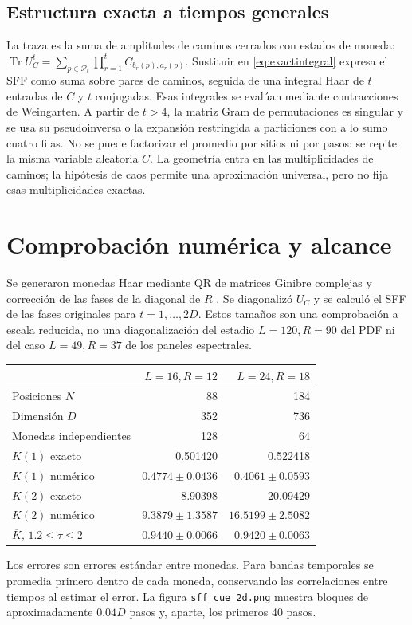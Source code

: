 \documentclass[11pt]{article}
\newcommand{\Tr}{\operatorname{Tr}}
\begin{document}
\subsection{Estructura exacta a tiempos generales}
La traza es la suma de amplitudes de caminos cerrados con estados de
moneda: $\Tr U_C^t=\sum_{p\in\mathcal P_t}\prod_{r=1}^t
C_{b_r(p),a_r(p)}$. Sustituir en \eqref{eq:exactintegral} expresa el
SFF como suma sobre pares de caminos, seguida de una integral Haar
de $t$ entradas de $C$ y $t$ conjugadas. Esas integrales se evalúan
mediante contracciones de Weingarten. A partir de $t>4$, la matriz
Gram de permutaciones es singular y se usa su pseudoinversa o la
expansión restringida a particiones con a lo sumo cuatro filas.
No se puede factorizar el promedio por sitios ni por pasos: se repite
la misma variable aleatoria $C$. La geometría entra en las
multiplicidades de caminos; la hipótesis de caos permite una
aproximación universal, pero no fija esas multiplicidades exactas.

\section{Comprobación numérica y alcance}
Se generaron monedas Haar mediante QR de matrices Ginibre complejas
y corrección de las fases de la diagonal de $R$ \cite{mezzadri}.
Se diagonalizó $U_C$ y se calculó el SFF de las fases originales para
$t=1,\ldots,2D$. Estos tamaños son una comprobación a escala reducida,
no una diagonalización del estadio $L=120,R=90$ del PDF ni del caso
$L=49,R=37$ de los paneles espectrales.

\begin{center}
\begin{tabular}{lrr}
\toprule
 & $L=16,R=12$ & $L=24,R=18$\\
\midrule
Posiciones $N$ & 88 & 184\\
Dimensión $D$ & 352 & 736\\
Monedas independientes & 128 & 64\\
$K(1)$ exacto & 0.501420 & 0.522418\\
$K(1)$ numérico & $0.4774\pm0.0436$ & $0.4061\pm0.0593$\\
$K(2)$ exacto & 8.90398 & 20.09429\\
$K(2)$ numérico & $9.3879\pm1.3587$ & $16.5199\pm2.5082$\\
$\overline K$, $1.2\leq\tau\leq2$ & $0.9440\pm0.0066$ & $0.9420\pm0.0063$\\
\bottomrule
\end{tabular}
\end{center}
Los errores son errores estándar entre monedas. Para bandas temporales
se promedia primero dentro de cada moneda, conservando las
correlaciones entre tiempos al estimar el error. La figura
\texttt{sff\_cue\_2d.png} muestra bloques de aproximadamente $0.04D$
pasos y, aparte, los primeros 40 pasos.
\end{document}
